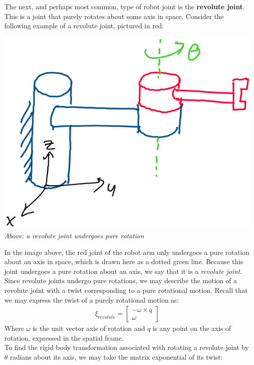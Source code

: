 \documentclass[oneside]{book}
\begin{document}
The next, and perhaps most common, type of robot joint is the \textbf{revolute joint}. This is a joint that purely rotates about some axis in space. Consider the following example of a revolute joint, pictured in red:
\begin{center}
    \includegraphics[scale=0.3]{images/revoluteJoint.png}\\
    \textit{Above: a revolute joint undergoes pure rotation}
\end{center}
In the image above, the red joint of the robot arm only undergoes a pure rotation about an axis in space, which is drawn here as a dotted green line. Because this joint undergoes a pure rotation about an axis, we say that it is a \textit{revolute joint}.\\
Since revolute joints undergo pure rotations, we may describe the motion of a revolute joint with a twist corresponding to a pure rotational motion. Recall that we may express the twist of a purely rotational motion as:
\begin{align}
    \xi_{revolute} = 
    \begin{bmatrix}
        -\omega \times q\\
        \omega
    \end{bmatrix}
\end{align}
Where $\omega$ is the unit vector axis of rotation and $q$ is any point on the axis of rotation, expressed in the spatial frame.\\
To find the rigid body transformation associated with rotating a revolute joint by $\theta$ radians about its axis, we may take the matrix exponential of its twist:
\end{document}
